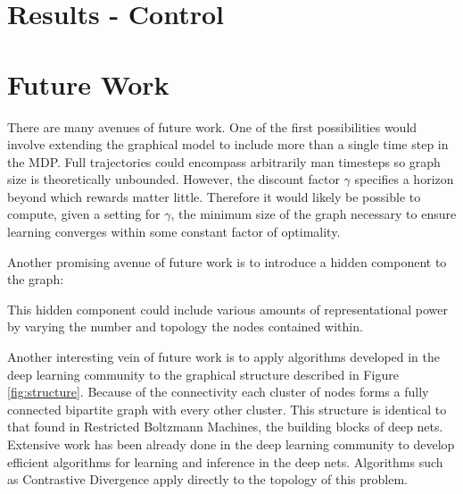 \documentclass{article} %
\begin{document}
\section{Results - Control}

\section{Future Work}
There are many avenues of future work. One of the first possibilities would involve extending the graphical model to include more than a single time step in the MDP. Full trajectories could encompass arbitrarily man timesteps so graph size is theoretically unbounded. However, the discount factor $\gamma$ specifies a horizon beyond which rewards matter little. Therefore it would likely be possible to compute, given a setting for $\gamma$, the minimum size of the graph necessary to ensure learning converges within some constant factor of optimality. 

Another promising avenue of future work is to introduce a hidden component to the graph:


This hidden component could include various amounts of representational power by varying the number and topology the nodes contained within. 

Another interesting vein of future work is to apply algorithms developed in the deep learning community to the graphical structure described in Figure \ref{fig:structure}. Because of the connectivity each cluster of nodes forms a fully connected bipartite graph with every other cluster. This structure is identical to that found in Restricted Boltzmann Machines, the building blocks of deep nets. Extensive work has been already done in the deep learning community to develop efficient algorithms for learning and inference in the deep nets. Algorithms such as Contrastive Divergence \cite{hinton02} apply directly to the topology of this problem. 
\end{document}
